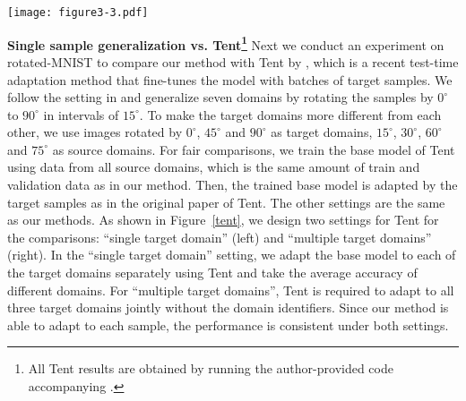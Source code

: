 \documentclass{article} \usepackage[table]{xcolor}
\begin{document}
\begin{figure*}[t] 
\centering 
\centerline{\texttt{[image: figure3-3.pdf]}} 
\vspace{-2mm}
\caption{\textbf{Single sample generalization vs. Tent} \citep{wang2021tent} for different settings on rotated-MNIST.
Tent shows good performance with a large batch of samples from a single domain (left).
However, when provided only one sample or given samples from different domains without the domain id (right), Tent suffers.
More detailed comparisons are provided in Appendix~\ref{apptent}. 
} 
\label{tent}
\vspace{-4mm}
\end{figure*} 



\textbf{Single sample generalization vs. Tent\footnote{All Tent results are obtained by running the author-provided code accompanying  \citep{wang2021tent}.}}
Next we conduct an experiment on rotated-MNIST to compare our method with Tent by \cite{wang2021tent}, which is a recent test-time adaptation method that fine-tunes the model with batches of target samples. 
We follow the setting in \citep{piratla2020efficient} and generalize seven domains by rotating the samples by $0^\circ$ to  $90^\circ$ in intervals of $15^\circ$. 
To make the target domains more different from each other, we use images rotated by $0^\circ$, $45^\circ$ and $90^\circ$ as target domains,  $15^\circ$, $30^\circ$, $60^\circ$ and  $75^\circ$ as source domains.
For fair comparisons, we train the base model of Tent using data from all source domains, which is the same amount of train and validation data as in our method.
Then, the trained base model is adapted by the target samples as in the original paper of Tent. The other settings are the same as our methods.
As shown in Figure~\ref{tent}, we design two settings for Tent for the comparisons: ``single target domain'' (left) and ``multiple target domains'' (right). In the ``single target domain'' setting, we adapt the base model to each of the target domains separately using Tent and take the average accuracy of different domains. For ``multiple target domains'', Tent is required to adapt to all three target domains jointly without the domain identifiers. 
Since our method is able to adapt to each sample, the performance is consistent under both settings.
\end{document}

